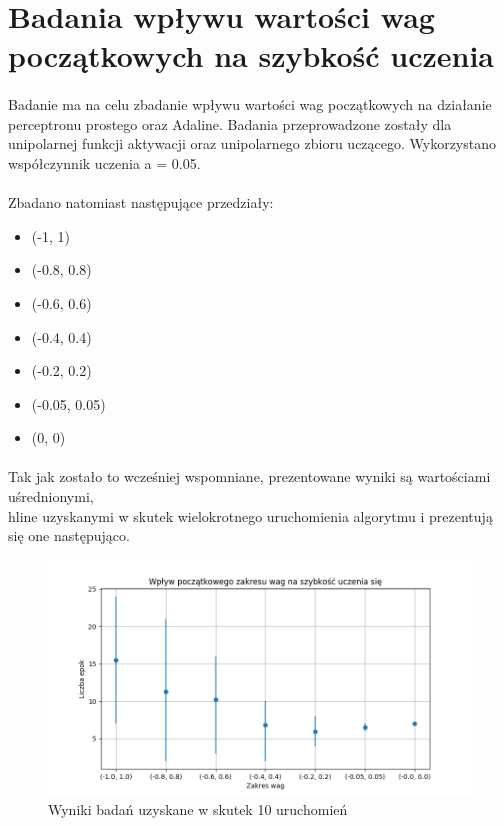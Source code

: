 \documentclass[../main.tex]{subfiles}
\begin{document}
    \justify
    \section{Badania wpływu wartości wag początkowych na szybkość uczenia}
    \paragraph{}
    Badanie ma na celu zbadanie wpływu wartości wag początkowych na działanie perceptronu prostego oraz Adaline. Badania przeprowadzone zostały dla unipolarnej funkcji aktywacji oraz unipolarnego zbioru uczącego. Wykorzystano współczynnik uczenia a = 0.05.
    
    \paragraph{}
    Zbadano natomiast następujące przedziały:
    \begin{itemize}
     \item (-1, 1)
     \item (-0.8,  0.8)
     \item (-0.6, 0.6)
     \item (-0.4, 0.4)
     \item (-0.2, 0.2)
     \item (-0.05, 0.05)
     \item (0, 0)
    \end{itemize}
    
    \paragraph{}
    Tak jak zostało to wcześniej wspomniane, prezentowane wyniki są wartościami uśrednionymi, \\hline
    uzyskanymi w skutek wielokrotnego uruchomienia algorytmu i prezentują się one następująco.

    \begin{figure}[H]
    \includegraphics[scale=0.7]{test_weights_SimplePerceptron_10}
    \caption{Wyniki badań uzyskane w skutek 10 uruchomień}
    \end{figure}
\end{document}
